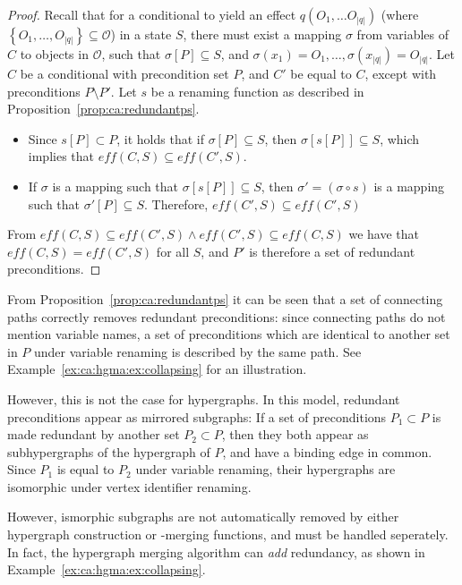 \documentclass[../Master.tex]{subfiles}
\begin{document}
\begin{proof} 
    Recall that for a conditional to yield an effect $q\left(O_1, \dots O_{|q|}\right)$ (where $\left\{ O_1, \dots, O_{|q|}\right\} \subseteq \mathcal{O}$) in a state $S$, there must exist a mapping $\sigma$ from variables of $C$ to objects in $\mathcal{O}$, such that $\sigma\left[ P \right] \subseteq S$, and $\sigma\left(x_1\right) = O_1, \dots, \sigma\left(x_{|q|}\right) = O_{|q|}$. Let $C$ be a conditional with precondition set $P$, and $C'$ be equal to $C$, except with preconditions $P \setminus P'$. Let $s$ be a renaming function as described in Proposition~\ref{prop:ca:redundantps}.
    \begin{itemize}
        \item Since $s\left[ P \right] \subset P$, it holds that if $\sigma \left[ P \right] \subseteq S$, then $\sigma \left[ s \left[ P \right] \right] \subseteq S$, which implies that $eff(C,S) \subseteq eff(C',S)$.

        \item If $\sigma$ is a mapping such that $\sigma \left[ s \left[ P \right]\right] \subseteq S$, then $\sigma' = \left(\sigma \circ s \right)$ is a mapping such that $\sigma' \left[P\right] \subseteq S$. Therefore, $eff(C', S) \subseteq eff(C', S)$
    \end{itemize}
    From $eff(C, S) \subseteq eff(C',S) \land eff(C',S) \subseteq eff(C, S)$ we have that $eff(C,S) = eff(C',S)$ for all $S$, and $P'$ is therefore a set of redundant preconditions.
\end{proof}

From Proposition~\ref{prop:ca:redundantps} it can be seen that a set of connecting paths correctly removes redundant preconditions: since connecting paths do not mention variable names, a set of preconditions which are identical to another set in $P$ under variable renaming is described by the same path. See Example~\ref{ex:ca:hgma:ex:collapsing} for an illustration.

However, this is not the case for hypergraphs. In this model, redundant preconditions appear as mirrored subgraphs: If a set of preconditions $P_1 \subset P$ is made redundant by another set $P_2 \subset P$, then they both appear as subhypergraphs of the hypergraph of $P$, and have a binding edge in common. Since $P_1$ is equal to $P_2$ under variable renaming, their hypergraphs are isomorphic under vertex identifier renaming. 

However, ismorphic subgraphs are not automatically removed by either hypergraph construction or -merging functions, and must be handled seperately. In fact, the hypergraph merging algorithm can \textit{add} redundancy, as shown in Example~\ref{ex:ca:hgma:ex:collapsing}.
\end{document}
